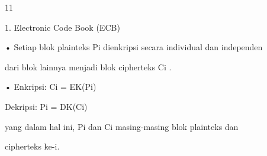 \documentclass{article}
\begin{document}

11

1. Electronic Code Book (ECB)

• Setiap blok plainteks Pi dienkripsi secara individual dan independen 

dari blok lainnya menjadi blok cipherteks Ci . 

• Enkripsi: Ci = EK(Pi)

 Dekripsi: Pi = DK(Ci)

 yang dalam hal ini, Pi dan Ci masing-masing blok plainteks dan 

cipherteks ke-i.
\end{document}
